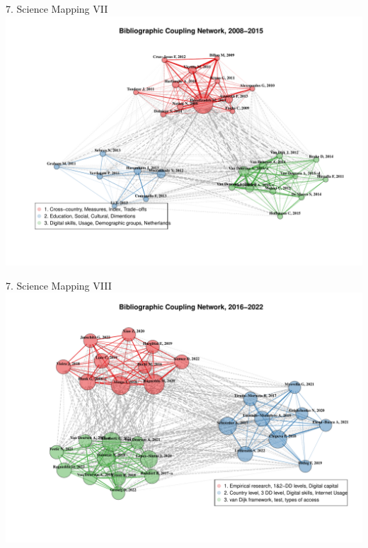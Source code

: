 \documentclass[
  ignorenonframetext,
]{beamer}
\begin{document}
\begin{frame}{7. Science Mapping VII}
\protect\hypertarget{science-mapping-vii}{}
\includegraphics{Presentation_bibliometric_Urbino_may_23_files/figure-beamer/Bib_coup_P2-1.pdf}
\end{frame}

\begin{frame}{7. Science Mapping VIII}
\protect\hypertarget{science-mapping-viii}{}
\includegraphics{Presentation_bibliometric_Urbino_may_23_files/figure-beamer/Bib_coup_P3-1.pdf}
\end{frame}
\end{document}
